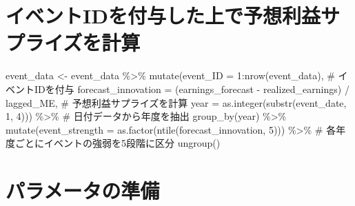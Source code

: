 \documentclass[
  letterpaper,
  DIV=11,
  numbers=noendperiod]{scrreprt}
\newenvironment{Shaded}{\begin{snugshade}}{\end{snugshade}}
\newcommand{\AttributeTok}[1]{\textcolor[rgb]{0.40,0.45,0.13}{#1}}
\newcommand{\CommentTok}[1]{\textcolor[rgb]{0.37,0.37,0.37}{#1}}
\newcommand{\DecValTok}[1]{\textcolor[rgb]{0.68,0.00,0.00}{#1}}
\newcommand{\FunctionTok}[1]{\textcolor[rgb]{0.28,0.35,0.67}{#1}}
\newcommand{\NormalTok}[1]{\textcolor[rgb]{0.00,0.23,0.31}{#1}}
\newcommand{\OtherTok}[1]{\textcolor[rgb]{0.00,0.23,0.31}{#1}}
\newcommand{\SpecialCharTok}[1]{\textcolor[rgb]{0.37,0.37,0.37}{#1}}
\begin{document}
\section{イベントIDを付与した上で予想利益サプライズを計算}\label{ux30a4ux30d9ux30f3ux30c8idux3092ux4ed8ux4e0eux3057ux305fux4e0aux3067ux4e88ux60f3ux5229ux76caux30b5ux30d7ux30e9ux30a4ux30baux3092ux8a08ux7b97}

\begin{Shaded}
\begin{Highlighting}[]
\NormalTok{event\_data }\OtherTok{\textless{}{-}}\NormalTok{ event\_data }\SpecialCharTok{\%\textgreater{}\%}
  \FunctionTok{mutate}\NormalTok{(}\AttributeTok{event\_ID =} \DecValTok{1}\SpecialCharTok{:}\FunctionTok{nrow}\NormalTok{(event\_data), }\CommentTok{\# イベントIDを付与}
         \AttributeTok{forecast\_innovation =}\NormalTok{ (earnings\_forecast }\SpecialCharTok{{-}}\NormalTok{ realized\_earnings) }\SpecialCharTok{/}\NormalTok{ lagged\_ME, }\CommentTok{\# 予想利益サプライズを計算}
         \AttributeTok{year =} \FunctionTok{as.integer}\NormalTok{(}\FunctionTok{substr}\NormalTok{(event\_date, }\DecValTok{1}\NormalTok{, }\DecValTok{4}\NormalTok{))) }\SpecialCharTok{\%\textgreater{}\%} \CommentTok{\# 日付データから年度を抽出}
  \FunctionTok{group\_by}\NormalTok{(year) }\SpecialCharTok{\%\textgreater{}\%}
  \FunctionTok{mutate}\NormalTok{(}\AttributeTok{event\_strength =} \FunctionTok{as.factor}\NormalTok{(}\FunctionTok{ntile}\NormalTok{(forecast\_innovation, }\DecValTok{5}\NormalTok{))) }\SpecialCharTok{\%\textgreater{}\%} \CommentTok{\# 各年度ごとにイベントの強弱を5段階に区分}
  \FunctionTok{ungroup}\NormalTok{() }
\end{Highlighting}
\end{Shaded}

\section{パラメータの準備}\label{ux30d1ux30e9ux30e1ux30fcux30bfux306eux6e96ux5099}

\begin{Shaded}
\end{Shaded}
\end{document}
